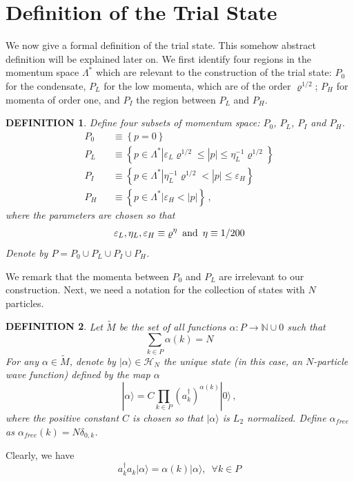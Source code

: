 \documentclass[11pt]{article}
\numberwithin{equation}{section}
\newcommand{\beq}{\begin{equation}}
\newcommand{\eeq}{\end{equation}}
\newcommand{\beqa}{\begin{eqnarray}}
\newcommand{\eeqa}{\end{eqnarray}}
\newcommand\N{{\mathbb N}}
\newcommand\eps{\varepsilon}
\newcommand\rmand{ \,\,\,{\rm and}\,\,\, }
\newcommand\al{{\alpha}}
\renewcommand\rho\varrho
\newtheorem{mydef}{DEFINITION}[section]
\theoremstyle{definition}
\begin{document}
\section{Definition of the Trial State}\label{trialstate}

We now give a formal definition of the trial state. This somehow abstract definition will be explained later on.  
We first identify  four regions in the momentum space  $\Lambda^*$  which are  relevant to the construction of the trial state: $P_0$ for the condensate,  $P_L$ for the low momenta, which are of the order  $\rho^{1/2}$;  $P_H$ for momenta of order one, and $P_I$ the region between 
$P_L$ and $P_H$. 

\begin{mydef} \label{def1} Define four subsets of momentum space: $P_0$, $P_L$, $P_I$ and $P_H$.
\beqa\nonumber
P_0&&\equiv\left\{p=0\right\}\\\nonumber
P_L&&\equiv\left\{p\in \Lambda^*| \eps_L\rho^{1/2}\leq|p|\leq \eta^{-1}_L\rho^{1/2}\right\}\\\nonumber
P_I&&\equiv\left\{p\in \Lambda^*|\eta^{-1}_L\rho^{1/2} <   |p|\leq \eps_H\right\}\\
P_H&&\equiv\left\{p\in \Lambda^*|\eps_H <   |p|\right\}\, , 
\eeqa
where the parameters are chosen so that  
\beq\label{defepseta}
\eps_L, \eta_L, \eps_H\equiv\rho^{\eta}\rmand \eta\equiv1/200
\eeq
Denote by $P = P_0\cup P_L \cup P_I \cup P_H$.
\end{mydef}
We remark that the momenta between $P_0$ and $P_L$ are irrelevant to our construction. 
Next, we need a notation for the collection of states with $N$ particles. 
\begin{mydef}
Let  $\widetilde M$ be  the set of all functions $\al: P \rightarrow \N\cup 0$ such that
\beq
\sum_{k\in P}\al(k)=N
\eeq
For any $\al \in \widetilde M$,  denote by $|\al\rangle\in \mathcal H_N$  the unique state (in this case, an  $N$-particle  wave function) 
defined by the map $\alpha$ 
\[
|\al\rangle =  C \prod_{k\in P} (a^\dagger_k)^{\alpha(k)} | 0 \rangle\, , 
\]
where the positive constant $C$ is chosen so that $|\al\rangle $ is $L_2$ normalized.  
Define $\al_{free}$ as $\al_{free}(k)=N\delta_{0,k}$.
\end{mydef}

Clearly, we have 
\beq\label{number}
a^\dagger_k a_k|\al\rangle=\al(k)|\al\rangle,\,\,\, \forall k\in P
\eeq



\end{document}
